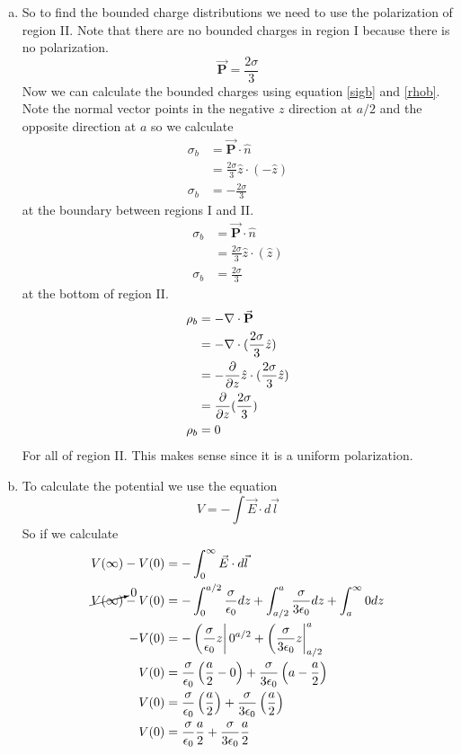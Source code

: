 \documentclass[11pt]{article}
\numberwithin{equation}{section}
\newcommand{\grad}{\bold\nabla}
\newcommand{\vecE}{\vec{E}}
\newcommand{\vecP}{\vec{\mathbf{P}}}
\begin{document}
\begin{enumerate}[(a)]
\item
So to find the bounded charge distributions we need to use the polarization of region II. Note that there are no bounded charges in region I because there is no polarization. 
$$\vecP = \frac{2\sigma}{3}$$
Now we can calculate the bounded charges using equation \ref{sigb} and \ref{rhob}. Note the normal vector points in the negative $z$ direction at $a/2$ and the opposite direction at $a$ so we calculate
\begin{align*}
\sigma_b &= \vecP\cdot\hat{n}\\
&= \frac{2\sigma}{3}\hat{z}\cdot(-\hat{z})\\
\sigma_b &= -\frac{2\sigma}{3}
\end{align*}
at the boundary between regions I and II.
\begin{align*}
\sigma_b &= \vecP\cdot\hat{n}\\
&= \frac{2\sigma}{3}\hat{z}\cdot(\hat{z})\\
\sigma_b &= \frac{2\sigma}{3}
\end{align*}
at the bottom of region II.
\begin{align*}
\rho_b&=-\grad\cdot\vecP\\
&=-\grad\cdot(\frac{2\sigma}{3}\hat{z})\\
&=-\frac{\partial}{\partial z}\hat{z}\cdot(\frac{2\sigma}{3}\hat{z})\\
&=\frac{\partial}{\partial z}(\frac{2\sigma}{3})\\
\rho_b &=0
\end{align*}
For all of region II. This makes sense since it is a uniform polarization.
\item
To calculate the potential we use the equation
$$V = -\int\vecE\cdot d\vec{l}$$
So if we calculate 
\begin{align*}
V(\infty) - V(0) &= -\int_0^{\infty}\vecE\cdot d\vec{l}\\
\cancelto{0}{V(\infty)} - V(0) &= -\int_0^{a/2}\frac{\sigma}{\epsilon_0} dz+\int_{a/2}^{a}\frac{\sigma}{3\epsilon_0}dz +\int_a^{\infty}0dz\\
- V(0) &= -\left(\frac{\sigma}{\epsilon_0}z\right|0^{a/2}+\left(\frac{\sigma}{3\epsilon_0}z\right|_{a/2}^{a}\\
V(0) &= \frac{\sigma}{\epsilon_0}\left(\frac{a}{2}-0\right)+\frac{\sigma}{3\epsilon_0}\left(a-\frac{a}{2}\right)\\
V(0) &= \frac{\sigma}{\epsilon_0}\left(\frac{a}{2}\right)+\frac{\sigma}{3\epsilon_0}\left(\frac{a}{2}\right)\\
V(0) &= \frac{\sigma}{\epsilon_0}\frac{a}{2}+\frac{\sigma}{3\epsilon_0}\frac{a}{2}\\

\end{align*}
\end{enumerate}
\end{document}
